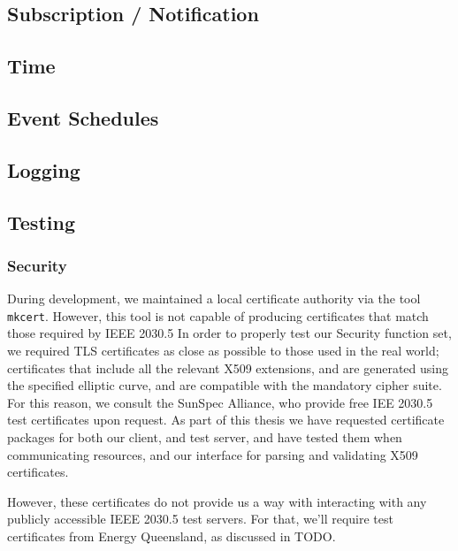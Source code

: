 \subsection{Subscription / Notification}

\subsection{Time}

\subsection{Event Schedules}

\subsection{Logging}

\subsection{Testing}

\subsubsection{Security}
During development, we maintained a local certificate authority via the tool \texttt{mkcert}. However, this tool is not capable of producing certificates that match those required by IEEE 2030.5
In order to properly test our Security function set, we required TLS certificates as close as possible to those used in the real world; certificates that include all the relevant X509 extensions, and are generated using the specified elliptic curve, and are compatible with the mandatory cipher suite. For this reason, we consult the SunSpec Alliance, who provide free IEE 2030.5 test certificates upon request. As part of this thesis we have requested certificate packages for both our client, and test server, and have tested them when communicating resources, and our interface for parsing and validating X509 certificates.

However, these certificates do not provide us a way with interacting with any publicly accessible IEEE 2030.5 test servers. For that, we'll require test certificates from Energy Queensland, as discussed in TODO.









